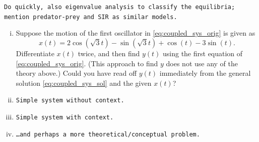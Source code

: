 \begin{application}
\texttt{Do quickly, also eigenvalue analysis to classify the equilibria; mention predator-prey and SIR as similar models.}
\end{application}

\begin{exercise}
\begin{enumerate}[(i)]
\item
Suppose the motion of the first oscillator in \eqref{eq:coupled_sys_orig} is given as
\[ x(t) = 2\cos\left(\sqrt{3}t\right) - \sin\left(\sqrt{3}t\right) + \cos\left(t\right) -3\sin\left(t\right).\]
Differentiate $x(t)$ twice, and then find $y(t)$ using the first equation of \eqref{eq:coupled_sys_orig}. (This approach to find $y$ does not use any of the theory above.) Could you have read off $y(t)$ immediately from the general solution \eqref{eq:coupled_sys_sol} and the given $x(t)$?
\item \texttt{Simple system without context.}
\item \texttt{Simple system with context.}
\item \texttt{\ldots and perhaps a more theoretical/conceptual problem.}
\end{enumerate}
\end{exercise}